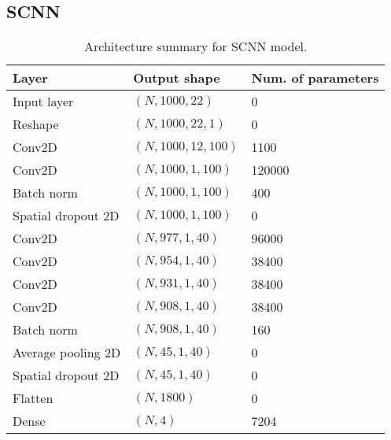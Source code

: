 \documentclass{article}
\begin{document}
\subsection{SCNN}
\begin{table}[ht]
\begin{center}
    \begin{tabular}{|l|l|l|}
        \hline
        Layer   & Output shape  & Num. of parameters \\
        \hline\hline
        Input layer         & $(N, 1000, 22)$       & 0         \\
        Reshape             & $(N, 1000, 22, 1)$    & 0         \\
        Conv2D              & $(N, 1000, 12, 100)$  & 1100      \\
        Conv2D              & $(N, 1000, 1, 100)$   & 120000    \\
        Batch norm          & $(N, 1000, 1, 100)$   & 400       \\
        Spatial dropout 2D  & $(N, 1000, 1, 100)$   & 0         \\
        Conv2D              & $(N, 977, 1, 40)$     & 96000     \\
        Conv2D              & $(N, 954, 1,40)$      & 38400     \\
        Conv2D              & $(N, 931, 1, 40)$     & 38400     \\
        Conv2D              & $(N, 908, 1, 40)$     & 38400     \\
        Batch norm          & $(N, 908, 1, 40)$     & 160       \\
        Average pooling 2D  & $(N, 45, 1, 40)$      & 0         \\
        Spatial dropout 2D  & $(N, 45, 1, 40)$      & 0         \\
        Flatten             & $(N, 1800)$           & 0         \\
        Dense               & $(N, 4)$              & 7204      \\
        \hline
    \end{tabular}
\end{center}
\caption{Architecture summary for SCNN model.}
\label{tab:scnn}
\end{table}
\end{document}
